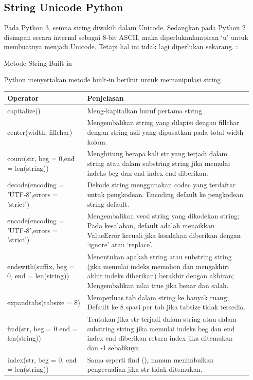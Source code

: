 \subsection{String Unicode Python}
Pada Python 3, semua string diwakili dalam Unicode. Sedangkan pada Python 2 disimpan secara internal sebagai 8-bit ASCII, maka diperlukanlampiran ‘u’ untuk membuatnya menjadi Unicode. Tetapi hal ini tidak lagi diperlukan sekarang. :

Metode String Built-in

Python menyertakan metode built-in berikut untuk memanipulasi string
\begin{center}
\begin{tabular}{ | m{3cm} | m{7cm} | }
\hline
Operator & Penjelasan \\
\hline
capitalize() & Meng-kapitalkan huruf pertama string \\
\hline
center(width, fillchar) & Mengembalikan string yang dilapisi dengan fillchar dengan string asli yang dipusatkan pada total width kolom. \\
\hline
count(str, beg = 0,end = len(string)) & Menghitung berapa kali str yang terjadi dalam string atau dalam substring string jika memulai indeks beg dan end index end diberikan. \\
\hline
decode(encoding = 'UTF-8',errors = 'strict') & Dekode string menggunakan codec yang terdaftar untuk pengkodean. Encoding default ke pengkodean string default. \\
\hline
encode(encoding = 'UTF-8',errors = 'strict') & Mengembalikan versi string yang dikodekan string; Pada kesalahan, default adalah menaikkan ValueError kecuali jika kesalahan diberikan dengan ‘ignore’ atau ‘replace’. \\
\hline
endswith(suffix, beg = 0, end = len(string)) & Menentukan apakah string atau substring string (jika memulai indeks memohon dan mengakhiri akhir indeks diberikan) berakhir dengan akhiran; Mengembalikan nilai true jika benar dan salah. \\
\hline
expandtabs(tabsize = 8) & Memperluas tab dalam string ke banyak ruang; Default ke 8 spasi per tab jika tabsize tidak tersedia. \\
\hline
find(str, beg = 0 end = len(string)) & Tentukan jika str terjadi dalam string atau dalam substring string jika memulai indeks beg dan end index end diberikan return index jika ditemukan dan -1 sebaliknya. \\
\hline
index(str, beg = 0, end = len(string)) & Sama seperti find (), namun menimbulkan pengecualian jika str tidak ditemukan. \\

\end{tabular}
\end{center}
